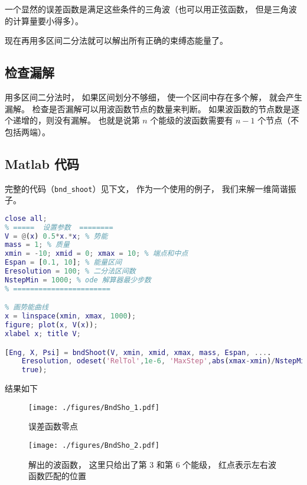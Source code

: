 一个显然的误差函数是满足这些条件的三角波（也可以用正弦函数， 但是三角波的计算量要小得多）。

现在再用多区间二分法就可以解出所有正确的束缚态能量了。

\subsection{检查漏解}
用多区间二分法时， 如果区间划分不够细， 使一个区间中存在多个解， 就会产生漏解。 检查是否漏解可以用波函数节点的数量来判断。 如果波函数的节点数是逐个递增的，则没有漏解。 也就是说第 $n$ 个能级的波函数需要有 $n - 1$ 个节点（不包括两端）。

\subsection{Matlab 代码}

完整的代码（\verb|bnd_shoot|）见下文， 作为一个使用的例子， 我们来解一维简谐振子。

\begin{lstlisting}[language=matlab, caption=bndShootDemo.m]
close all;
% =====  设置参数  ========
V = @(x) 0.5*x.*x; % 势能
mass = 1; % 质量
xmin = -10; xmid = 0; xmax = 10; % 端点和中点
Espan = [0.1, 10]; % 能量区间
Eresolution = 100; % 二分法区间数
NstepMin = 1000; % ode 解算器最少步数
% =======================

% 画势能曲线
x = linspace(xmin, xmax, 1000);
figure; plot(x, V(x));
xlabel x; title V;

[Eng, X, Psi] = bndShoot(V, xmin, xmid, xmax, mass, Espan, ....
    Eresolution, odeset('RelTol',1e-6, 'MaxStep',abs(xmax-xmin)/NstepMin),...
    true);
\end{lstlisting}

结果如下
\begin{figure}[ht]
\centering
\texttt{[image: ./figures/BndSho\_1.pdf]}
\caption{误差函数零点} \label{BndSho_fig1}
\end{figure}

\begin{figure}[ht]
\centering
\texttt{[image: ./figures/BndSho\_2.pdf]}
\caption{解出的波函数， 这里只给出了第 3 和第 6 个能级， 红点表示左右波函数匹配的位置} \label{BndSho_fig2}
\end{figure}

